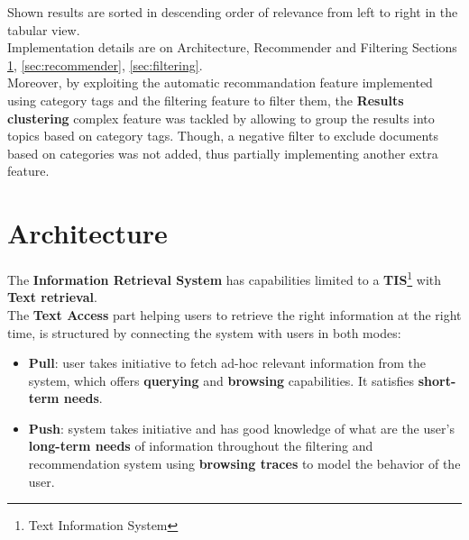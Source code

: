 \documentclass[12pt]{spieman}  %
\begin{document}
\begin{spacing}{1}
    Shown results are sorted in descending order of relevance from left to right in the tabular view.\\
    Implementation details are on Architecture, Recommender and Filtering Sections
    \ref{sec:architecture}, \ref{sec:recommender}, \ref{sec:filtering}.\\
    Moreover, by exploiting the automatic recommandation feature implemented using category tags
    and the filtering feature to filter them,
    the \textbf{Results clustering} complex feature was tackled by allowing to group the results
    into topics based on category tags.
    Though, a negative filter to exclude documents based on categories was not added,
    thus partially implementing another extra feature.\\

    \section{Architecture}\label{sec:architecture}

    The \textbf{Information Retrieval System} has capabilities limited to a
    \textbf{TIS}\footnote{Text Information System}
    with \textbf{Text retrieval}.\\
    The \textbf{Text Access} part helping users to retrieve the right information at the right time,
    is structured by connecting the system with users in both modes:
    \begin{itemize}
        \item \textbf{Pull}: user takes initiative to fetch ad-hoc relevant information from the system,
              which offers \textbf{querying} and \textbf{browsing} capabilities.
              It satisfies \textbf{short-term needs}.
        \item \textbf{Push}: system takes initiative and has good knowledge of what are the user's
              \textbf{long-term needs} of information throughout the filtering and recommendation system
              using \textbf{browsing traces} to model the behavior of the user.
    \end{itemize}


\end{spacing}
\end{document}
